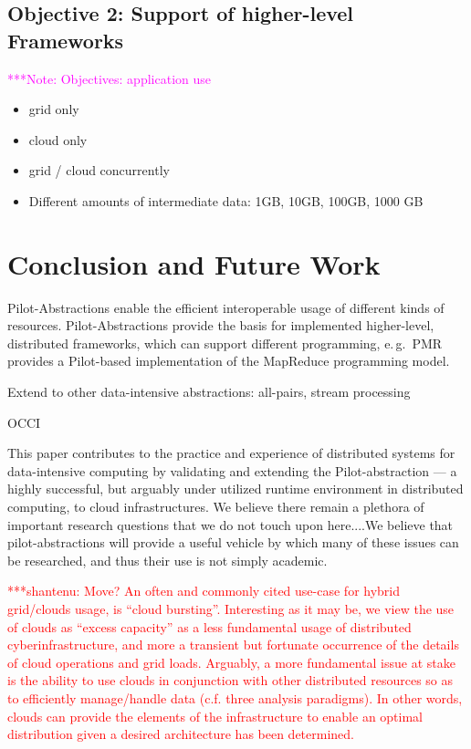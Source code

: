 \documentclass[times]{cpeauth}
\newcommand{\jhanote}[1]{ {\textcolor{red} { ***shantenu: #1 }}}
\newcommand{\note}[1]{ {\textcolor{magenta} { ***Note: #1 }}}
\newcommand{\jhanote}[1]{}
\newcommand{\note}[1]{}
\newcommand{\pilot}{Pilot\xspace}
\begin{document}
\subsection{Objective 2: Support of higher-level Frameworks}

\note{Objectives: application use}



\begin{itemize}
	\item grid only
	\item cloud only
	\item grid / cloud concurrently
	\item  Different amounts of intermediate data: 1GB, 10GB, 100GB, 1000 GB	
\end{itemize}

\section{Conclusion and Future Work}


\pilot-Abstractions enable the efficient interoperable usage of different 
kinds of resources. \pilot-Abstractions provide the basis for implemented 
higher-level, distributed frameworks, which can support different programming, 
e.\,g.\ PMR provides a \pilot-based implementation of the MapReduce 
programming model.

Extend to other data-intensive abstractions: all-pairs, stream processing

OCCI

This paper contributes to the practice and experience of distributed
systems for data-intensive computing by validating and extending the
\pilot-abstraction --- a highly successful, but arguably under
utilized runtime environment in distributed computing, to cloud
infrastructures. We believe there remain a plethora of important
research questions that we do not touch upon here....We believe that
pilot-abstractions will provide a useful vehicle by which many of
these issues can be researched, and thus their use is not simply
academic.

\jhanote{Move? An often and commonly cited use-case for hybrid
  grid/clouds usage, is ``cloud bursting''.  Interesting as it may be,
  we view the use of clouds as ``excess capacity'' as a less
  fundamental usage of distributed cyberinfrastructure, and more a
  transient but fortunate occurrence of the details of cloud
  operations and grid loads. Arguably, a more fundamental issue at
  stake is the ability to use clouds in conjunction with other
  distributed resources so as to efficiently manage/handle data
  (c.f. three analysis paradigms). In other words, clouds can provide
  the elements of the infrastructure to enable an optimal distribution
  given a desired architecture has been determined.}
\end{document}
